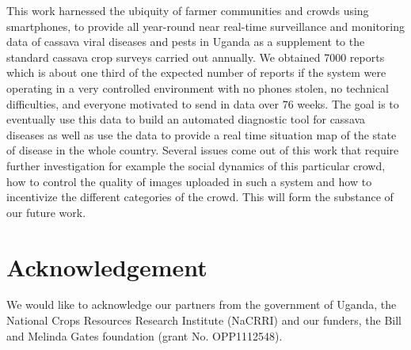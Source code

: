 \documentclass[letterpaper]{article} %
\begin{document}
This work harnessed the ubiquity of farmer communities and crowds using smartphones, to provide all year-round near real-time surveillance and monitoring data of cassava viral diseases and pests in Uganda as a supplement to the standard cassava crop surveys carried out annually. We obtained 7000 reports which is about one third of the expected number of reports if the system were operating in a very controlled environment with no phones stolen, no technical difficulties, and everyone motivated to send in data over 76 weeks. The goal is to eventually use this data to build an automated diagnostic tool for cassava diseases as well as use the data to provide a real time situation map of the state of disease in the whole country. Several issues come out of this work that require further investigation for example the social dynamics of this particular crowd, how to control the quality of images uploaded in such a system and how to incentivize the different categories of the crowd. This will form the substance of our future work. 


\section{Acknowledgement}
We would like to acknowledge our partners from the government of Uganda, the National Crops Resources Research Institute (NaCRRI) and our funders, the Bill and Melinda Gates foundation (grant No. OPP1112548). 
\end{document}
